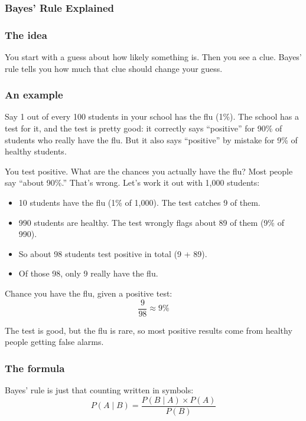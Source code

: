 \subsubsection*{Bayes' Rule Explained}



\subsubsection*{The idea}

You start with a guess about how likely something is. Then you see a clue. Bayes' rule tells you how much that clue should change your guess.

\subsubsection*{An example}

Say 1 out of every 100 students in your school has the flu (1\%). The school has a test for it, and the test is pretty good: it correctly says ``positive'' for 90\% of students who really have the flu. But it also says ``positive'' by mistake for 9\% of healthy students.

You test positive. What are the chances you actually have the flu? Most people say ``about 90\%.'' That's wrong. Let's work it out with 1,000 students:

\begin{itemize}
  \item 10 students have the flu (1\% of 1,000). The test catches 9 of them.
  \item 990 students are healthy. The test wrongly flags about 89 of them (9\% of 990).
  \item So about 98 students test positive in total (9 + 89).
  \item Of those 98, only 9 really have the flu.
\end{itemize}

Chance you have the flu, given a positive test:
\[
\frac{9}{98} \approx 9\%
\]

The test is good, but the flu is rare, so most positive results come from healthy people getting false alarms.

\subsubsection*{The formula}

Bayes' rule is just that counting written in symbols:
\[
P(A \mid B) = \frac{P(B \mid A) \times P(A)}{P(B)}
\]

